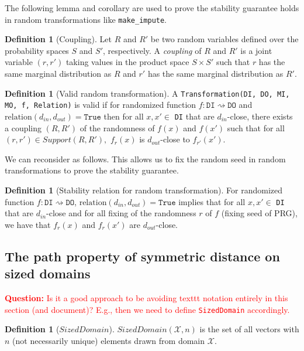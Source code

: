\documentclass[11pt,a4paper]{article}
\theoremstyle{definition}
\newtheorem{definition}[theorem]{Definition}
\newcommand{\Relation}{\mathrm{relation}}
\newcommand{\questionc}[1]{\textcolor{red}{\textbf{Question:} #1}}
\begin{document}
The following lemma and corollary are used to prove the stability guarantee holds in random transformations like \texttt{make\_impute}. 

\begin{definition}[Coupling]
Let $R$ and $R'$ be two random variables defined over the probability spaces $S$ and $S'$, respectively. A \emph{coupling} of $R$ and $R'$ is a joint variable $(r, r')$ taking values in the product space $S \times S'$ such that $r$ has the same marginal distribution as $R$ and $r'$ has the same marginal distribution as $R'$.\cite{ts2020}
\end{definition}

\begin{definition}[Valid random transformation]
A \texttt{Transformation(DI, DO, MI, MO, f, Relation)} is valid if for randomized function $f: \texttt{DI} \rightsquigarrow \texttt{DO}$ and  $\Relation(d_{in}, d_{out}) = \texttt{True}$ then for all $x, x' \in$ \texttt{DI} that are $d_{in}$-close, there exists a coupling $(R, R')$ of the randomness of $f(x)$ and $f(x')$ such that for all $(r, r') \in Support(R, R'),$ $f_r(x)$ is $d_{out}$-close to $f_{r'}(x')$.
\end{definition}

We can reconsider as follows. This allows us to fix the random seed in random transformations to prove the stability guarantee.

\begin{definition}[Stability relation for random transformation]
For randomized function $f: \texttt{DI} \rightsquigarrow \texttt{DO}$, $\Relation(d_{in}, d_{out}) = \texttt{True}$ implies that for all $x, x' \in$ \texttt{DI} that are $d_{in}$-close and for all fixing of the randomness $r$ of $f$ (fixing seed of PRG), we have that $f_r(x)$ and $f_r(x')$ are $d_{out}$-close.
\end{definition}

\subsection{The path property of symmetric distance on sized domains}\label{sec:pathsized}

\questionc{Is it a good approach to be avoiding texttt notation entirely in this section (and document)? E.g., then we need to define \texttt{SizedDomain} accordingly.}

\begin{definition}[$SizedDomain$]
    $SizedDomain(\mathcal{X},n)$ is the set of all vectors with $n$ (not necessarily unique) elements drawn from domain $\mathcal{X}$.
\end{definition}
\end{document}
